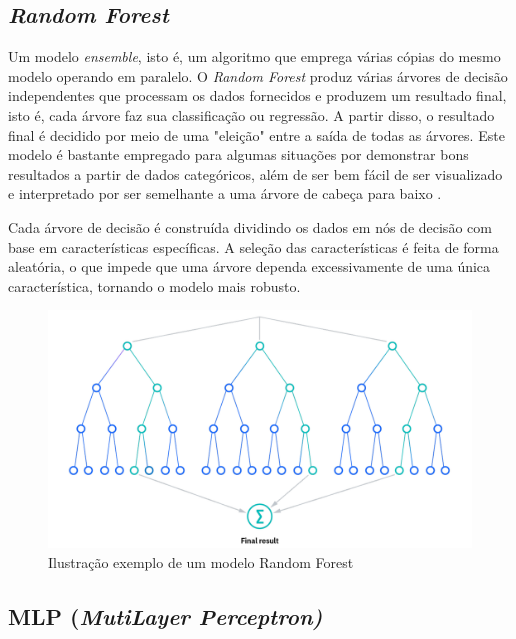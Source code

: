 \subsection{\textbf{\textit{Random Forest}}}

Um modelo \textit{ensemble}, isto é, um algoritmo que emprega várias cópias do mesmo modelo operando em paralelo. O \textit{Random Forest} produz várias árvores de decisão independentes que processam os dados fornecidos e produzem um resultado final, isto é, cada árvore faz sua classificação ou regressão. A partir disso, o resultado final é decidido por meio de uma "eleição" entre
a saída de todas as árvores. Este modelo é bastante empregado para algumas situações por demonstrar bons resultados a partir de dados categóricos, além de ser bem fácil de ser visualizado e interpretado por ser semelhante a uma árvore de cabeça para baixo \cite{oreillyML}.

Cada árvore de decisão é construída dividindo os dados em nós de decisão com base em características específicas. A seleção das características é feita de forma aleatória, o que impede que uma árvore dependa excessivamente de uma única característica, tornando o modelo mais robusto.

\begin{figure}[htb]
	\centering
	\begin{minipage}{0.9\linewidth}
		\centering
		\includegraphics[width=\linewidth]{tg1/figuras/random.png}
		\caption{Ilustração exemplo de um modelo Random Forest
            \cite{rf_fig}} \label{fig:rfmodel}
	\end{minipage}
\end{figure}

\subsection{\textbf{MLP (\textit{MutiLayer Perceptron)}}}

